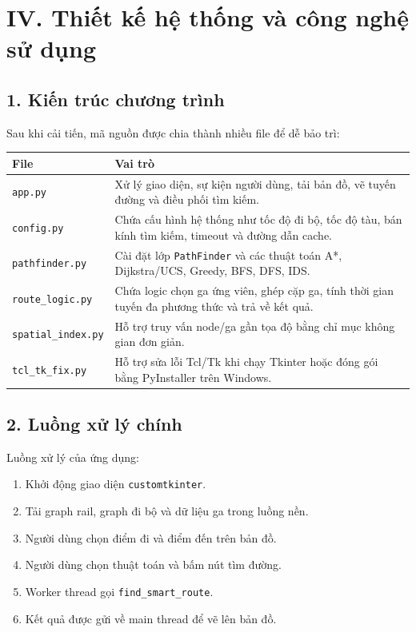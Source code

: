 \documentclass[12pt,a4paper]{article}
\begin{document}
\section*{IV. Thiết kế hệ thống và công nghệ sử dụng}

\subsection*{1. Kiến trúc chương trình}

Sau khi cải tiến, mã nguồn được chia thành nhiều file để dễ bảo trì:

\begin{longtable}{|p{4cm}|p{10cm}|}
\hline
\textbf{File} & \textbf{Vai trò}\\
\hline
\texttt{app.py} & Xử lý giao diện, sự kiện người dùng, tải bản đồ, vẽ tuyến đường và điều phối tìm kiếm.\\
\hline
\texttt{config.py} & Chứa cấu hình hệ thống như tốc độ đi bộ, tốc độ tàu, bán kính tìm kiếm, timeout và đường dẫn cache.\\
\hline
\texttt{pathfinder.py} & Cài đặt lớp \texttt{PathFinder} và các thuật toán A*, Dijkstra/UCS, Greedy, BFS, DFS, IDS.\\
\hline
\texttt{route\_logic.py} & Chứa logic chọn ga ứng viên, ghép cặp ga, tính thời gian tuyến đa phương thức và trả về kết quả.\\
\hline
\texttt{spatial\_index.py} & Hỗ trợ truy vấn node/ga gần tọa độ bằng chỉ mục không gian đơn giản.\\
\hline
\texttt{tcl\_tk\_fix.py} & Hỗ trợ sửa lỗi Tcl/Tk khi chạy Tkinter hoặc đóng gói bằng PyInstaller trên Windows.\\
\hline
\end{longtable}

\subsection*{2. Luồng xử lý chính}

Luồng xử lý của ứng dụng:
\begin{enumerate}
    \item Khởi động giao diện \texttt{customtkinter}.
    \item Tải graph rail, graph đi bộ và dữ liệu ga trong luồng nền.
    \item Người dùng chọn điểm đi và điểm đến trên bản đồ.
    \item Người dùng chọn thuật toán và bấm nút tìm đường.
    \item Worker thread gọi \texttt{find\_smart\_route}.
    \item Kết quả được gửi về main thread để vẽ lên bản đồ.
\end{enumerate}
\end{document}
